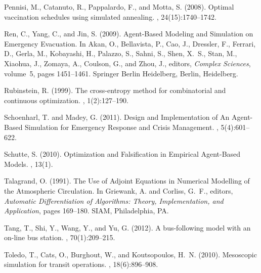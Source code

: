 \documentclass[11pt]{article}
\begin{document}
\begin{thebibliography}{}
Pennisi, M., Catanuto, R., Pappalardo, F., and Motta, S. (2008).
\newblock Optimal vaccination schedules using simulated annealing.
, 24(15):1740--1742.

Ren, C., Yang, C., and Jin, S. (2009).
\newblock Agent-{{Based Modeling}} and {{Simulation}} on {{Emergency
  Evacuation}}.
\newblock In Akan, O., Bellavista, P., Cao, J., Dressler, F., Ferrari, D.,
  Gerla, M., Kobayashi, H., Palazzo, S., Sahni, S., Shen, X.~S., Stan, M.,
  Xiaohua, J., Zomaya, A., Coulson, G., and Zhou, J., editors, {\em Complex
  {{Sciences}}}, volume~5, pages 1451--1461. {Springer Berlin Heidelberg},
  Berlin, Heidelberg.

Rubinstein, R. (1999).
\newblock The cross-entropy method for combinatorial and continuous
  optimization.
,
  1(2):127--190.

Schoenharl, T. and Madey, G. (2011).
\newblock Design and {{Implementation}} of {{An Agent}}-{{Based Simulation}}
  for {{Emergency Response}} and {{Crisis Management}}.
,
  5(4):601--622.

Schutte, S. (2010).
\newblock Optimization and {{Falsification}} in {{Empirical Agent}}-{{Based
  Models}}.
, 13(1).

Talagrand, O. (1991).
\newblock The {{Use}} of {{Adjoint Equations}} in {{Numerical Modelling}} of
  the {{Atmospheric Circulation}}.
\newblock In Griewank, A. and Corliss, G.~F., editors, {\em Automatic
  {{Differentiation}} of {{Algorithms}}: {{Theory}}, {{Implementation}}, and
  {{Application}}}, pages 169--180. {SIAM}, Philadelphia, PA.

Tang, T., Shi, Y., Wang, Y., and Yu, G. (2012).
\newblock A bus-following model with an on-line bus station.
, 70(1):209--215.

Toledo, T., Cats, O., Burghout, W., and Koutsopoulos, H.~N. (2010).
\newblock Mesoscopic simulation for transit operations.
,
  18(6):896--908.


\end{thebibliography}
\end{document}
